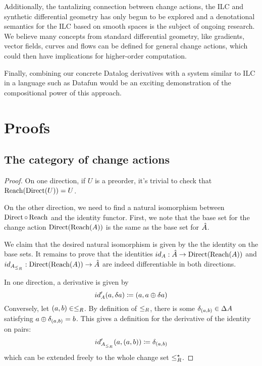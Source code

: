 Additionally, the tantalizing connection between change actions, the ILC and synthetic
differential geometry has only begun to be explored and a denotational semantics for the
ILC based on smooth spaces is the subject of ongoing research. We believe many concepts
from standard differential geometry, like gradients, vector fields, curves and flows can
be defined for general change actions, which could then have implications for higher-order
computation.

Finally, combining our concrete Datalog derivatives with a system similar to ILC
in a language such as Datafun would be an exciting demonstration of the compositional
power of this approach.

\printbibliography

\clearpage
\appendix
\appendixpage
\section{Proofs}

\subsection{The category of change actions}

\preordEquivalence*
\begin{proof}
  \label{prf:preordEquivalence}
  On one direction, if $U$ is a preorder, it's trivial to check that $\operatorname{Reach} (\operatorname{Direct} (U)) = U$.

  On the other direction, we need to find a natural isomorphism between $\operatorname{Direct} \circ \operatorname{Reach}$
  and the identity functor. First, we note that the base set for the change action
  $\operatorname{Direct}(\operatorname{Reach}(A))$ is the same as the base set for $\hat{A}$.

  We claim that the desired natural isomorphism is given by the
  the identity on the base sets. It remains to prove that the identities
  $id_A : \hat{A} \rightarrow \operatorname{Direct}(\operatorname{Reach}(A))$ and
  $id_{A_{\leq_R}} : \operatorname{Direct}(\operatorname{Reach}(A)) \rightarrow \hat{A}$
  are indeed differentiable in both directions.

  In one direction, a derivative is given by
  \begin{displaymath}
    id'_A(a, \delta a) \coloneqq (a, a \oplus \delta a)
  \end{displaymath}
  Conversely, let $(a, b) \in \leq_R$. By definition of $\leq_R$, there is some
  $\delta_{(a, b)} \in \Delta A$ satisfying $a \oplus \delta_{(a,b)} = b$.
  This gives a definition for the derivative of the identity on pairs:
  \begin{displaymath}
    id'_{A_{\leq_R}}(a, (a, b)) \coloneqq \delta_{(a, b)}
  \end{displaymath}
  which can be extended freely to the whole change set $\leq_R^\star$. 
\end{proof}


